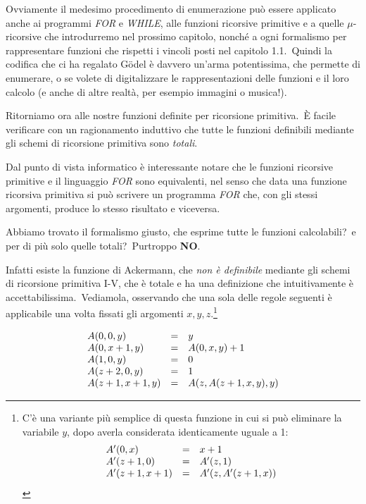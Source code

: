 Ovviamente il medesimo procedimento di enumerazione può essere applicato anche ai programmi \textit{\footnotesize FOR} e \textit{\footnotesize WHILE}, alle funzioni ricorsive primitive e a quelle $\mu$-ricorsive che introdurremo nel prossimo capitolo, nonché a ogni formalismo per rappresentare funzioni che rispetti i vincoli posti nel capitolo 1.1.\
Quindi la codifica che ci ha regalato G\"odel è davvero un'arma potentissima, che permette di enumerare, o se volete di digitalizzare le rappresentazioni delle funzioni e il loro calcolo (e anche di altre realtà, per esempio immagini o musica!).

\medskip
\noindent Ritorniamo ora alle nostre funzioni definite per ricorsione primitiva.\
È facile verificare con un ragionamento induttivo che tutte le funzioni definibili mediante gli schemi di ricorsione primitiva sono \textit{totali}.\

Dal punto di vista informatico è interessante notare che le funzioni ricorsive primitive e il linguaggio \textit{\footnotesize FOR} sono equivalenti, nel senso che data una funzione ricorsiva primitiva si può scrivere un programma \textit{\footnotesize FOR} che, con gli stessi argomenti, produce lo stesso risultato e viceversa.

\begin{question}
    Abbiamo trovato il formalismo giusto, che esprime tutte le funzioni calcolabili?\ e per di più solo quelle totali?\ Purtroppo \textbf{NO}.\
\end{question}

\noindent Infatti esiste la funzione di Ackermann, che \textit{non è definibile} mediante gli schemi di ricorsione primitiva I-V, che è totale e ha una definizione che intuitivamente è accettabilissima.\
Vediamola, osservando che una sola delle regole seguenti è applicabile una volta fissati gli argomenti $x, y, z$.\footnote{C'è una variante più semplice di questa funzione in cui si può eliminare la variabile $y$, dopo averla considerata identicamente uguale a 1:
    \[\begin{array}{l c l}
            A'(0,x)     & = & x + 1            \\
            A'(z+1,0)   & = & A'(z,1)          \\
            A'(z+1,x+1) & = & A'(z, A'(z+1,x)) \\
        \end{array}\]}

\[
    \begin{array}{l c l}
        A(0,0,y)     & = & y                 \\
        A(0, x+1,y)  & = & A(0,x,y)+1        \\
        A(1,0,y)     & = & 0                 \\
        A(z+2, 0,y)  & = & 1                 \\
        A(z+1,x+1,y) & = & A(z,A(z+1,x,y),y) \\
    \end{array}
\]

